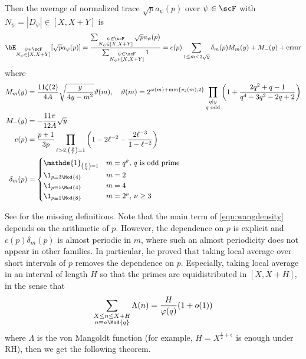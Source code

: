 \begin{theorem}
    \label{thm:wang}
    Then the average of normalized trace $\sqrt{p} a_\psi(p)$ over $\psi \in \scF$ with $N_\psi = |D_\psi| \in [X, X + Y]$ is
    \begin{equation}
        \label{eqn:wangdensity}
        \bE_{\substack{\psi \in \scF \\ N_\psi \in [X, X + Y]}}[\sqrt{p} a_\psi(p)] = \frac{\sum_{\substack{\psi \in \scF \\ N_\psi \in [X, X + Y]}} \sqrt{p} a_\psi(p)}{\sum_{\substack{\psi \in \scF \\ N_\psi \in [X, X + Y]}} 1} = c(p) \sum_{1 \le m < 2 \sqrt{y}} \delta_m(p) M_m(y) + M_-(y) + \text{error}
    \end{equation}
    where
    \begin{align*}
        M_m(y) &= \frac{11\zeta(2)}{4A} \sqrt{\frac{y}{4y - m^2}} \vartheta(m), \quad \vartheta(m) = 2^{\omega(m) + \min\{v_2(m), 2\}} \prod_{\substack{q \mid y \\ q \text{ odd}}} \left(1 + \frac{2 q^2 + q - 1}{q^4 - 3q^2 - 2q + 2}\right)\\
        M_-(y) &= -\frac{11\pi}{12 A} \sqrt{y}\\
        c(p) &= \frac{p+1}{3p} \prod_{\ell > 2, \left(\frac{p}{\ell}\right) = 1} \left(1 - 2 \ell^{-2} - \frac{2 \ell^{-3}}{1 - \ell^{-2}}\right) \\
        \delta_m(p) &= \begin{cases}
            \mathds{1}_{\left(\frac{p}{q}\right) = 1} & m = q^k, \,q\text{ is odd prime} \\
            \1_{p \equiv 3 \Mod{4}} & m = 2 \\
            \1_{p \equiv 5 \Mod{4}} & m = 4 \\
            \1_{p \equiv 1 \Mod{8}} & m = 2^\nu, \,\nu \ge 3
        \end{cases}
    \end{align*}
\end{theorem}
See \cite[Theorem 1]{wang2025murmurations} for the missing definitions.
Note that the main term of \eqref{eqn:wangdensity} depends on the arithmetic of $p$.
However, the dependence on $p$ is explicit and $c(p) \delta_m(p)$ is almost periodic in $m$, where such an almost periodicity does not appear in other families.
In particular, he proved that taking local average over short intervals of $p$ removes the dependence on $p$.
Especially, taking local average in an interval of length $H$ so that the primes are equidistributed in $[X, X + H]$, in the sense that
\[
\sum_{\substack{X \le n \le X + H \\ n \equiv a \Mod{q}}} \Lambda(n) = \frac{H}{\varphi(q)} (1 + o(1))
\]
where $\Lambda$ is the von Mangoldt function (for example, $H = X^{\frac{1}{2} + \epsilon}$ is enough under RH), then we get the following theorem.

